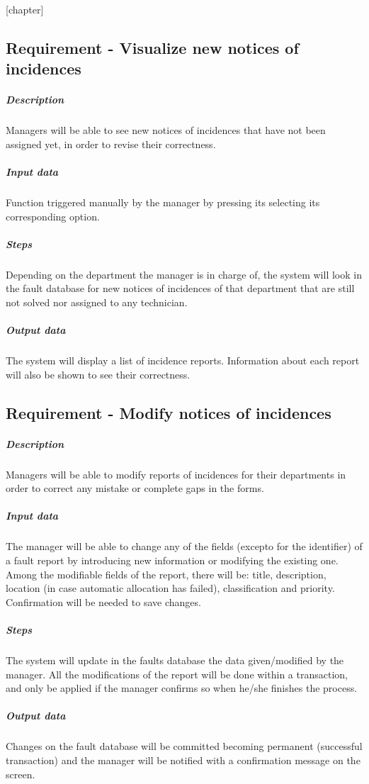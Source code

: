 
[chapter]
\newcommand{\header}[1]{\\ \indent \textbf{#1}\hspace{10pt}}

\newcommand{\reqdesc}{\subparagraph{Description}}
\newcommand{\reqin}{\subparagraph{Input data}}
\newcommand{\reqout}{\subparagraph{Output data}}
\newcommand{\reqsteps}{\subparagraph{Steps}}

\newenvironment{requirement}[1]{
	\subsection{Requirement  - #1}
}{\vspace{20pt}}


\begin{requirement}{Visualize new notices of incidences}

\reqdesc Managers will be able to see new notices of incidences that have not been assigned yet, in order to revise their correctness.

\reqin Function triggered manually by the manager by pressing its selecting its corresponding option.

\reqsteps Depending on the department the manager is in charge of, the system will look in the fault database for new notices of incidences of that department that are still not solved nor assigned to any technician.

\reqout The system will display a list of incidence reports. Information about each report will also be shown to see their correctness.

\end{requirement}


\begin{requirement}{Modify notices of incidences}

\reqdesc Managers will be able to modify reports of incidences for their departments in order to correct any mistake or complete gaps in the forms.

\reqin The manager will be able to change any of the fields (excepto for the identifier) of a fault report by introducing new information or modifying the existing one. Among the modifiable fields of the report, there will be: title, description, location (in case automatic allocation has failed), classification and priority. Confirmation will be needed to save changes.

\reqsteps The system will update in the faults database the data given/modified by the manager. All the modifications of the report will be done within a transaction, and only be applied if the manager confirms so when he/she finishes the process.

\reqout Changes on the fault database will be committed becoming permanent (successful transaction) and the manager will be notified with a confirmation message on the screen.

\end{requirement}


